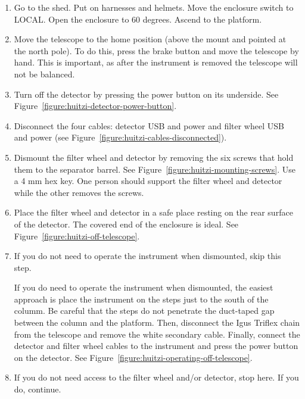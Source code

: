 \begin{enumerate}

    \item Go to the shed. Put on harnesses and helmets. Move the enclosure switch to LOCAL. Open the enclosure to 60 degrees. Ascend to the platform.

    \item Move the telescope to the home position (above the mount and pointed at the north pole). To do this, press the brake button and move the telescope by hand. This is important, as after the instrument is removed the telescope will not be balanced.

    \item Turn off the detector by pressing the power button on its underside. See Figure~\ref{figure:huitzi-detector-power-button}.

    \item Disconnect the four cables: detector USB and power and filter wheel USB and power (see Figure~\ref{figure:huitzi-cables-disconnected}).

    \item Dismount the filter wheel and detector by removing the six screws that hold them to the separator barrel. See Figure~\ref{figure:huitzi-mounting-screws}. Use a 4 mm hex key.  One person should support the filter wheel and detector while the other removes the screws.

    \item Place the filter wheel and detector in a safe place resting on the rear surface of the detector. The covered end of the enclosure is ideal. See Figure~\ref{figure:huitzi-off-telescope}.

    \item If you do not need to operate the instrument when dismounted, skip this step.
    
    If you do need to operate the instrument when dismounted, the easiest approach is place the instrument on the steps just to the south of the columm. Be careful that the steps do not penetrate the duct-taped gap between the column and the platform.
    Then, disconnect the Igus Triflex chain from the telescope and remove the white secondary cable. Finally, connect the detector and filter wheel cables to the instrument and press the power button on the detector. See Figure~\ref{figure:huitzi-operating-off-telescope}.
    
    \item If you do not need access to the filter wheel and/or detector, stop here.  If you do, continue.
    

\end{enumerate}
